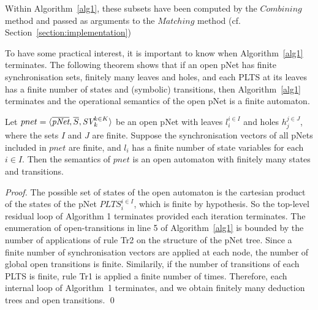 \documentclass[smallcondensed]{svjour3}
\newcommand{\TODO}[1]{\textcolor{red}{\textbf{[TODO:#1]}}}
\newcommand{\Pred}{\symb{Pred}}
\begin{document}

Within Algorithm~\ref{alg1}, these subsets have been computed by the
$Combining$ method and passed as arguments to the $Matching$ method
(cf. Section~\ref{section:implementation}) 

To have some practical interest, it is important to know when Algorithm~\ref{alg1} terminates. The following theorem shows that if an open pNet
has finite synchronisation sets, finitely many leaves and
holes, and each PLTS at its leaves has a finite number of states and
(symbolic) transitions, then Algorithm~\ref{alg1} terminates and the operational semantics of the open pNet is a finite automaton. 

\medskip
\begin{theorem}[Finiteness]\cite{henrio:Forte2016}
	Let $pnet=\langle \overline{\pNet},\overline{S}, \symb{SV}_k^{k\in K}\rangle$ be an open pNet  with leaves $l_i^{i\in I}$ and holes $h_j^{j\in
		J}$, where the sets $I$ and $J$ are finite. Suppose the synchronisation vectors of all pNets 
	included in  $pnet$   are finite, and 
	$l_i $ has a finite number of state variables for each $i\in I$. Then the semantics of $pnet$ is an open automaton 
	with finitely many states and transitions.
\end{theorem}
\begin{proof}
  The possible set of states of the open automaton is the cartesian
  product of the states of the pNet $PLTS_i^{i\in I}$, which is finite by
  hypothesis. So the top-level residual loop of Algorithm 1 terminates provided each 
  iteration terminates. The enumeration of open-transitions in line 5 of Algorithm~\ref{alg1} is bounded by the
  number of applications of rule Tr2 on the structure of the
  pNet tree. Since a finite number of synchronisation vectors are applied
  at each node, the number of global open transitions is finite. Similarily, if the number
  of transitions of each PLTS is finite, rule Tr1 is 
  applied a finite number of times. Therefore, each internal loop of Algorithm~1 terminates, and we obtain finitely many deduction trees and
  open transitions.
  \hfill \qed
  \end{proof}
\end{document}
